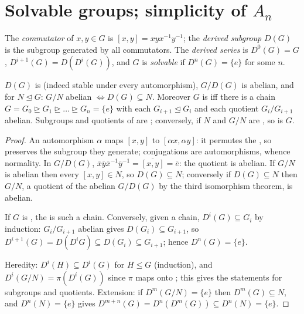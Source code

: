 \section{Solvable groups; simplicity of \texorpdfstring{$A_n$}{An}}

\begin{definition}\label{def:b3:groups:derived}
The \emph{commutator} of $x, y \in G$ is $[x,y]
= xyx^{-1}y^{-1}$; the \emph{derived subgroup} $D(G)$ is the subgroup generated by all commutators. The
\emph{derived series} is $D^0(G) = G$, $D^{i+1}(G) = D(D^i(G))$,
and $G$ is \emph{solvable} if $D^n(G) =
\{e\}$ for some $n$.
\end{definition}

\begin{proposition}\label{prop:b3:groups:derived}
$D(G)$ is  (indeed stable under every automorphism), $G/D(G)$
is abelian, and for $N \trianglelefteq G$: $G/N$ abelian $\iff
D(G) \subseteq N$. Moreover $G$ is  iff there is a chain
$G = G_0 \trianglerighteq G_1 \trianglerighteq \dots
\trianglerighteq G_n = \{e\}$ with each $G_{i+1} \trianglelefteq
G_i$ and each quotient $G_i/G_{i+1}$ abelian. Subgroups and
quotients of  are ; conversely, if $N$ and
$G/N$ are , so is $G$.
\end{proposition}

\begin{proof}
An automorphism $\alpha$ maps $[x,y]$ to $[\alpha x, \alpha y]$: it
permutes the , so preserves the subgroup they generate;
conjugations are automorphisms, whence normality. In $G/D(G)$,
$\bar x\bar y \bar x^{-1}\bar y^{-1} = \overline{[x,y]} = \bar e$:
the quotient is abelian. If $G/N$ is abelian then every $[x,y] \in
N$, so $D(G) \subseteq N$; conversely if $D(G) \subseteq N$ then
$G/N$, a quotient of the abelian $G/D(G)$ by the third isomorphism
theorem, is abelian.

If $G$ is , the  is such a chain. Conversely,
given a chain, $D^i(G) \subseteq G_i$ by induction: $G_i/G_{i+1}$
abelian gives $D(G_i) \subseteq G_{i+1}$, so $D^{i+1}(G) = D(D^i G)
\subseteq D(G_i) \subseteq G_{i+1}$; hence $D^n(G) = \{e\}$.

Heredity: $D^i(H) \subseteq D^i(G)$ for $H \leq G$ (induction),
and $D^i(G/N) = \pi(D^i(G))$ since $\pi$ maps  onto
; this gives the statements for subgroups and quotients.
Extension: if $D^m(G/N) = \{e\}$ then $D^m(G) \subseteq N$, and
$D^n(N) = \{e\}$ gives $D^{m+n}(G) = D^n(D^m(G)) \subseteq D^n(N)
= \{e\}$.
\end{proof}


